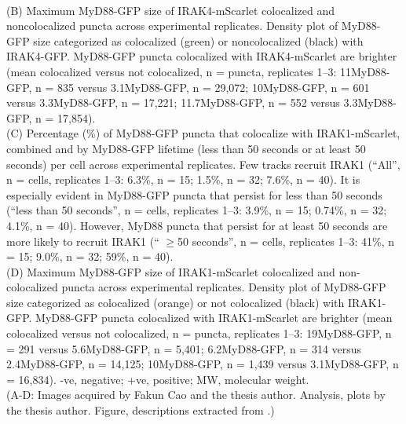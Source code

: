 \begin{centering}
{\vspace{1em}
\\
(B) Maximum MyD88-GFP size of IRAK4-mScarlet colocalized and noncolocalized puncta across experimental replicates. Density plot of MyD88-GFP size categorized as colocalized (green) or noncolocalized (black) with IRAK4-GFP. MyD88-GFP puncta colocalized with IRAK4-mScarlet are brighter (mean colocalized versus not colocalized, n = puncta, replicates 1--3: 11\times MyD88-GFP, n = 835 versus 3.1\times MyD88-GFP, n = 29,072; 10\times MyD88-GFP, n = 601 versus 3.3\times MyD88-GFP, n = 17,221; 11.7\times MyD88-GFP, n = 552 versus 3.3\times MyD88-GFP, n = 17,854).
\vspace{1em}
\\
(C) Percentage (\%) of MyD88-GFP puncta that colocalize with IRAK1-mScarlet, combined and by MyD88-GFP lifetime (less than 50 seconds or at least 50 seconds) per cell across experimental replicates. Few tracks recruit IRAK1 (“All”, n = cells, replicates 1--3: 6.3\%, n = 15; 1.5\%, n = 32; 7.6\%, n = 40). It is especially evident in MyD88-GFP puncta that persist for less than 50 seconds (“less than 50 seconds”, n = cells, replicates 1--3: 3.9\%, n = 15; 0.74\%, n = 32; 4.1\%, n = 40). However, MyD88 puncta that persist for at least 50 seconds are more likely to recruit IRAK1 (“ $\geq$50 seconds”, n = cells, replicates 1--3: 41\%, n = 15; 9.0\%, n = 32; 59\%, n = 40).
\vspace{1em}
\\
(D) Maximum MyD88-GFP size of IRAK1-mScarlet colocalized and non-colocalized puncta across experimental replicates. Density plot of MyD88-GFP size categorized as colocalized (orange) or not colocalized (black) with IRAK1-GFP. MyD88-GFP puncta colocalized with IRAK1-mScarlet are brighter (mean colocalized versus not colocalized, n = puncta, replicates 1--3: 19\times MyD88-GFP, n = 291 versus 5.6\times MyD88-GFP, n = 5,401; 6.2\times MyD88-GFP, n = 314 versus 2.4\times MyD88-GFP, n = 14,125; 10\times MyD88-GFP, n = 1,439 versus 3.1\times MyD88-GFP, n = 16,834). -ve, negative; +ve, positive; MW, molecular weight.
\vspace{1em}
\\
(A-D: Images acquired by Fakun Cao and the thesis author. Analysis, plots by the thesis author. Figure, descriptions extracted from \autocite{Deliz-Aguirre_2021}.)}
\label{p1:S4}
\end{centering}

